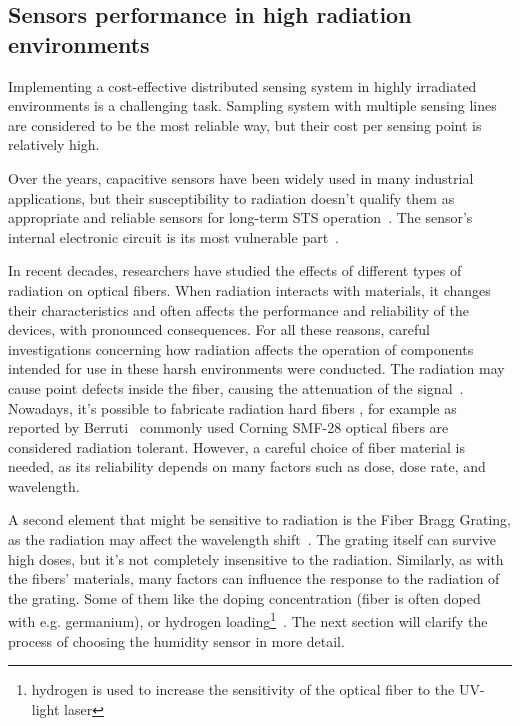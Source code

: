 \subsection{Sensors performance in high radiation environments}
\label{fos_irrad}
Implementing a cost-effective distributed sensing system in highly irradiated environments is a challenging task. Sampling system with multiple sensing lines are considered to be the most reliable way, but their cost per sensing point is relatively high. 

Over the years, capacitive sensors have been widely used in many industrial applications, but their susceptibility to radiation doesn't qualify them as appropriate and reliable sensors for long-term \gls{STS} operation~\cite{Kapic, capacitive_irrad, Berruti}. The sensor's internal electronic circuit is its most vulnerable part~\cite{SHCHEMEROV20222871}.

In recent decades, researchers have studied the effects of different types of radiation on optical fibers. When radiation interacts with materials, it changes their characteristics and often affects the performance and reliability of the devices, with pronounced consequences. For all these reasons, careful investigations concerning how radiation affects the operation of components intended for use in these harsh environments were conducted. The radiation may cause point defects inside the fiber, causing the attenuation of the signal~\cite{FOS_FIB_RAD}. Nowadays, it's possible to fabricate radiation hard fibers \cite{troska}, for example as reported by Berruti~\cite{Berruti} commonly used Corning SMF-28 optical fibers are considered radiation tolerant. However, a careful choice of fiber material is needed, as its reliability depends on many factors such as dose, dose rate, and wavelength.  

A second element that might be sensitive to radiation is the  Fiber Bragg Grating, as the radiation may affect the wavelength shift~\cite{gusarov}. The grating itself can survive high doses, but it's not completely insensitive to the radiation. Similarly, as with the fibers' materials, many factors can influence the response to the radiation of the grating. Some of them like the doping concentration (fiber is often doped with e.g. germanium), or hydrogen loading\footnote{hydrogen is used to increase the sensitivity of the optical fiber to the UV-light laser}~\cite{gusarov}. The next section will clarify the process of choosing the humidity sensor in more detail. 


